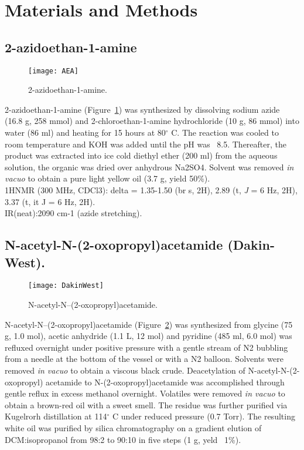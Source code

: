 \clearpage

\section{Materials and Methods}


\subsection{2-azidoethan-1-amine}

\begin{figure}
\centering
\texttt{[image: AEA]}
\caption{2-azidoethan-1-amine.}
\label{fig:AEA_Synth}
\end{figure}

2-azidoethan-1-amine (Figure~\ref{fig:AEA_Synth}) was synthesized by dissolving sodium azide (16.8 g, 258 mmol) and 2-chloroethan-1-amine hydrochloride (10 g, 86 mmol) into water (86 ml) and heating for 15 hours at 80${}^\circ$ C. The reaction was cooled to room temperature and KOH was added until the pH was ~8.5. Thereafter, the product was extracted into ice cold diethyl ether (200 ml) from the aqueous solution, the organic was dried over anhydrous Na2SO4. Solvent was removed {\it in vacuo} to obtain a pure light yellow oil (3.7 g, yield 50{\%}). \\

\noindent 
1HNMR (300 MHz, CDCl3): delta = 1.35-1.50 (br s, 2H), 2.89 (t, {\it J} = 6 Hz, 2H), 3.37 (t, {it J} = 6 Hz, 2H). \\
IR(neat):2090 cm-1 (azide stretching).

\clearpage


\subsection{N-acetyl-N-(2-oxopropyl)acetamide (Dakin-West).}

\begin{figure}
\centering
\texttt{[image: DakinWest]}
\caption{N-acetyl-N--(2-oxopropyl)acetamide.}
\label{fig:DakinWestSynth}
\end{figure}

N-acetyl-N--(2-oxopropyl)acetamide (Figure~\ref{fig:DakinWestSynth}) was synthesized from glycine (75 g, 1.0 mol), acetic anhydride (1.1 L, 12 mol) and pyridine (485 ml, 6.0 mol) was refluxed overnight under positive pressure with a gentle stream of N2 bubbling from a needle at the bottom of the vessel or with a N2 balloon. Solvents were removed {\it in vacuo} to obtain a viscous black crude. Deacetylation of N-acetyl-N-(2-oxopropyl) acetamide to N-(2-oxopropyl)acetamide was accomplished through gentle reflux in excess methanol overnight. Volatiles were removed {\it in vacuo} to obtain a brown-red oil with a sweet smell. The residue was further purified via Kugelrorh distillation at 114${}^\circ$ C under reduced pressure (0.7 Torr). The resulting white oil was purified by silica chromatography on a gradient elution of DCM:isopropanol from 98:2 to 90:10 in five steps (1 g, yeld ~1{\%}). \\

